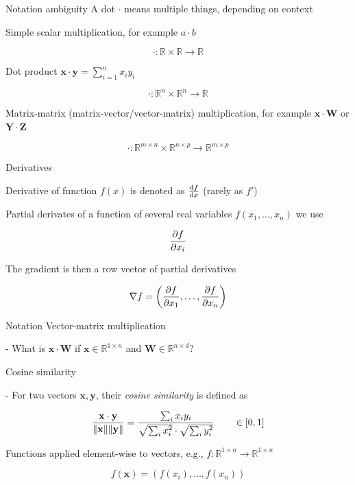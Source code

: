 \documentclass[12pt]{beamer}
\begin{document}
\begin{frame}{Notation ambiguity}
A dot $\cdot$ means multiple things, depending on context
	
Simple scalar multiplication, for example $a \cdot b$

$$\cdot : \mathbb{R} \times \mathbb{R} \to \mathbb{R}$$

Dot product $\mathbf{x} \cdot \mathbf{y} = \sum_{i = 1}^{n} x_i y_i$

$$\cdot : \mathbb{R}^n \times \mathbb{R}^n \to \mathbb{R}$$

Matrix-matrix (matrix-vector/vector-matrix) multiplication, for example $\mathbf{x} \cdot \mathbf{W}$ or $\mathbf{Y} \cdot \mathbf{Z}$

$$\cdot : \mathbb{R}^{m \times n} \times \mathbb{R}^{n \times p} \to \mathbb{R}^{m \times p}$$
	
\end{frame}

\begin{frame}{Derivatives}
	
Derivative of function $f(x)$ is denoted as $\dv{f}{x}$ (rarely as $f'$)

Partial derivates of a function of several real variables $f(x_1, \dots, x_n)$ we use

$$
\pdv{f}{x_i}
$$

The gradient is then a row vector of partial derivatives

$$
\nabla f = \left( \pdv{f}{x_1}, \dots, \pdv{f}{x_n}  \right)
$$
	
\end{frame}

\begin{frame}{Notation}
Vector-matrix multiplication

- What is $\mathbf{x} \cdot \mathbf{W}$ if $\mathbf{x} \in \mathbb{R}^{1 \times n}$ and $\mathbf{W} \in \mathbb{R}^{n \times d}$?

Cosine similarity

- For two vectors $\mathbf{x}, \mathbf{y}$, their \emph{cosine similarity} is defined as

$$
\frac{\mathbf{x} \cdot \mathbf{y}}{\norm{\mathbf{x}} \norm{\mathbf{y}}} =
\frac{\sum_i x_i y_i}{\sqrt{\sum_i {x_i^2}} \cdot \sqrt{\sum_i{y_i^2}}} \qquad \in \mathopen[ 0, 1\mathclose]
$$

Functions applied element-wise to vectors, e.g., $f: \mathbb{R}^{1 \times n} \to \mathbb{R}^{1 \times n}$

$$
f(\mathbf{x}) = (f(x_i), \dots, f(x_n))
$$

\end{frame}
\end{document}
